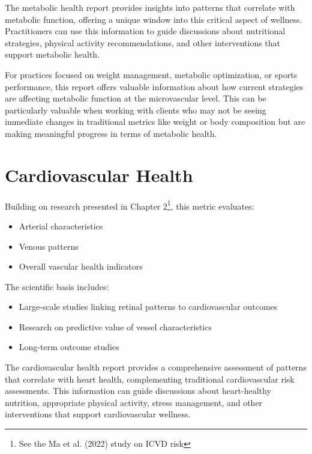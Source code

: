 \documentclass[
  Letterpaper,
]{scrbook}
\providecommand{\tightlist}{%
  \setlength{\itemsep}{0pt}\setlength{\parskip}{0pt}}\usepackage{longtable,booktabs,array}
\begin{document}
The metabolic health report provides insights into patterns that
correlate with metabolic function, offering a unique window into this
critical aspect of wellness. Practitioners can use this information to
guide discussions about nutritional strategies, physical activity
recommendations, and other interventions that support metabolic health.

For practices focused on weight management, metabolic optimization, or
sports performance, this report offers valuable information about how
current strategies are affecting metabolic function at the microvascular
level. This can be particularly valuable when working with clients who
may not be seeing immediate changes in traditional metrics like weight
or body composition but are making meaningful progress in terms of
metabolic health.

\section{Cardiovascular Health}\label{cardiovascular-health}

Building on research presented in Chapter 2\footnote{See the Ma et al.
  (2022) study on ICVD risk}, this metric evaluates:

\begin{itemize}
\tightlist
\item
  Arterial characteristics
\item
  Venous patterns
\item
  Overall vascular health indicators
\end{itemize}

The scientific basis includes:

\begin{itemize}
\tightlist
\item
  Large-scale studies linking retinal patterns to cardiovascular
  outcomes
\item
  Research on predictive value of vessel characteristics
\item
  Long-term outcome studies
\end{itemize}

The cardiovascular health report provides a comprehensive assessment of
patterns that correlate with heart health, complementing traditional
cardiovascular risk assessments. This information can guide discussions
about heart-healthy nutrition, appropriate physical activity, stress
management, and other interventions that support cardiovascular
wellness.
\end{document}
